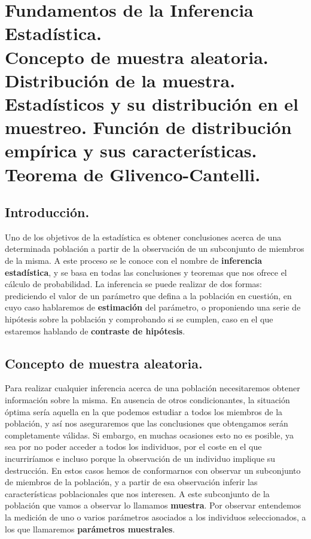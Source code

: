 \chapter[Fundamentos de la Inferencia Estad\'istica]{Fundamentos de la Inferencia Estad\'istica.\\
\normalsize Concepto de muestra aleatoria. Distribuci\'on de la muestra. Estad\'isticos y su distribuci\'on en el muestreo. Funci\'on de distribuci\'on emp\'irica y sus caracter\'isticas. Teorema de Glivenco-Cantelli.}

\section{Introducci\'on.}

Uno de los objetivos de la estad\'istica es obtener conclusiones acerca de una determinada poblaci\'on a partir de la observaci\'on de un subconjunto de miembros de la misma. A este proceso se le conoce con el nombre de \textbf{inferencia estad\'istica}, y se basa en todas las conclusiones y teoremas que nos ofrece el c\'alculo de probabilidad. La inferencia se puede realizar de dos formas: prediciendo el valor de un par\'ametro que defina a la poblaci\'on en cuesti\'on, en cuyo caso hablaremos de \textbf{estimaci\'on} del par\'ametro, o proponiendo una serie de hip\'otesis sobre la poblaci\'on y comprobando si se cumplen, caso en el que estaremos hablando de \textbf{contraste de hip\'otesis}.

\section{Concepto de muestra aleatoria.}

Para realizar cualquier inferencia acerca de una poblaci\'on necesitaremos obtener informaci\'on sobre la misma. En ausencia de otros condicionantes, la situaci\'on \'optima ser\'ia aquella en la que podemos estudiar a todos los miembros de la poblaci\'on, y as\'i nos aseguraremos que las conclusiones que obtengamos ser\'an completamente v\'alidas. Si embargo, en muchas ocasiones esto no es posible, ya sea por no poder acceder a todos los individuos, por el coste en el que incurrir\'iamos e incluso porque la observaci\'on de un individuo implique su destrucci\'on. En estos casos hemos de conformarnos con observar un subconjunto de miembros de la poblaci\'on, y a partir de esa observaci\'on inferir las caracter\'isticas poblacionales que nos interesen. A este subconjunto de la poblaci\'on que vamos a observar lo llamamos \textbf{muestra}. Por observar entendemos la medici\'on de uno o varios par\'ametros asociados a los individuos seleccionados, a los que llamaremos \textbf{par\'ametros muestrales}.

